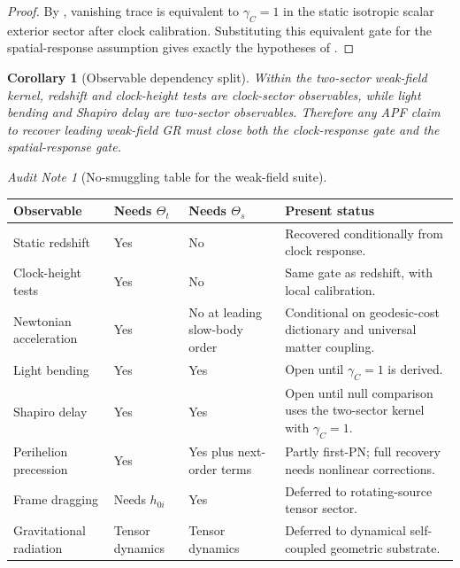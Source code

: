 \documentclass[11pt]{article}
\newtheorem{corollary}[theorem]{Corollary}
\theoremstyle{remark}
\newtheorem{audit}[theorem]{Audit Note}
\begin{document}
\begin{proof}
By , vanishing trace is equivalent to \(\gamma_C=1\) in the static isotropic scalar exterior sector after clock calibration.  Substituting this equivalent gate for the spatial-response assumption gives exactly the hypotheses of .
\end{proof}

\begin{corollary}[Observable dependency split]
\label{cor:observable-dependency-split}
Within the two-sector weak-field kernel, redshift and clock-height tests are clock-sector observables, while light bending and Shapiro delay are two-sector observables.  Therefore any APF claim to recover leading weak-field GR must close both the clock-response gate and the spatial-response gate.
\end{corollary}

\begin{audit}[No-smuggling table for the weak-field suite]
\begin{longtable}{p{}p{}p{}p{}}
\toprule
Observable & Needs \(\Theta_t\) & Needs \(\Theta_s\) & Present status \\
\midrule
Static redshift & Yes & No & Recovered conditionally from clock response. \\
Clock-height tests & Yes & No & Same gate as redshift, with local calibration. \\
Newtonian acceleration & Yes & No at leading slow-body order & Conditional on geodesic-cost dictionary and universal matter coupling. \\
Light bending & Yes & Yes & Open until \(\gamma_C=1\) is derived. \\
Shapiro delay & Yes & Yes & Open until null comparison uses the two-sector kernel with \(\gamma_C=1\). \\
Perihelion precession & Yes & Yes plus next-order terms & Partly first-PN; full recovery needs nonlinear corrections. \\
Frame dragging & Needs \(h_{0i}\) & Yes & Deferred to rotating-source tensor sector. \\
Gravitational radiation & Tensor dynamics & Tensor dynamics & Deferred to dynamical self-coupled geometric substrate. \\
\bottomrule
\end{longtable}
\end{audit}
\end{document}
